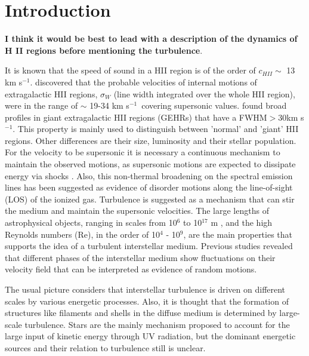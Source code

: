 \documentclass[fleqn,usenatbib, useAMS, a4paper]{mnras}
\newcommand\kms{$^{-1}$}
\begin{document}
\newcommand\WILL[1]{\textbf{\color{WillCommentColor}#1}}


\section{Introduction}
\WILL{I think it would be best to lead with a description of the dynamics of H II regions before mentioning the turbulence}.



It is known that the speed of sound in a HII region is of the order of \(c_{HII} \sim\) 13 km s\kms.
\citet{smith1970} discovered that the probable velocities of internal motions of extragalactic HII regions, \(\sigma_{W}\) (line width integrated over the whole HII region), were in the range of $\sim$ 19-34 km s\kms\ covering supersonic values.
\citet{skillman1984kinematics} found broad profiles in giant extragalactic HII regions (GEHRs) that have a FWHM\(>\)30km s\kms. 
This property is mainly used to distinguish between 'normal' and 'giant' HII regions. Other differences are their size, luminosity and their stellar population. 
For the velocity to be supersonic it is necessary a continuous mechanism to maintain the observed motions, as supersonic motions are expected to dissipate energy via shocks \citep{1994Ap&SS.216..285C}.
Also, this non-thermal broadening on the spectral emission lines has been suggested as evidence of disorder motions along the line-of-sight (LOS) of the ionized gas. 
Turbulence is suggested as a mechanism that can stir the medium and maintain the supersonic velocities. 
The large lengths of astrophysical objects, ranging in scales from 10$^{6}$ to 10$^{17}$ m \citep{2010ApJ...710..853C}, and the high Reynolds numbers (Re), in the order of 10$^{4}$ - 10$^{9}$, are the main properties that supports the idea of a turbulent interstellar medium.
Previous studies \citep{1999intu.conf.....F,2004ARA&A..42..211E,scalo2004interstellar} revealed that different phases of the interstellar medium show fluctuations on their velocity field that can be interpreted as evidence of random motions.

The usual picture considers that interstellar turbulence is driven on different scales by various energetic processes.
Also, it is thought that the formation of structures like filaments and shells in the diffuse medium is determined by large-scale turbulence.
Stars are the mainly mechanism proposed to account for the large input of kinetic energy through UV radiation, but the dominant energetic sources and their relation to turbulence still is unclear.
\end{document}

